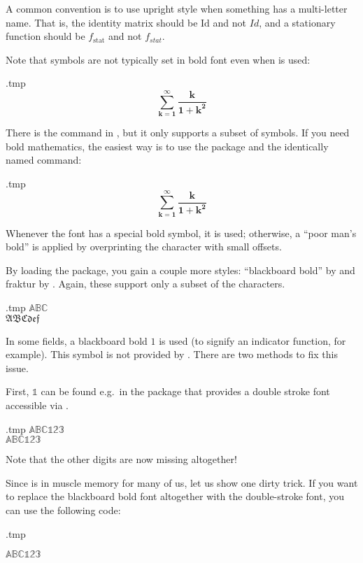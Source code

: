 \begin{practices}
A common convention is to use upright style when something has a multi-letter name.
That is, the identity matrix should be $\mathrm{Id}$ and not $Id$,
and a stationary function should be $f_{\mathrm{stat}}$ and not $f_{stat}$.
\end{practices}

Note that symbols are not typically set in bold font even when  is used:
%
\begin{VerbatimOut}{\jobname.tmp}
\[
\mathbf{\sum_{k=1}^\infty \frac{k}{1+k^2}}
\]
\end{VerbatimOut}
\ShowExample
%
There is the  command in ,
but it only supports a subset of symbols.
If you need bold mathematics, the easiest way is to use the  package
and the identically named command:
%
\begin{VerbatimOut}{\jobname.tmp}
\[
\bm{\sum_{k=1}^\infty \frac{k}{1+k^2}}
\]
\end{VerbatimOut}
\ShowExample
%
Whenever the font has a special bold symbol, it is used;
otherwise, a ``poor man's bold'' is applied by overprinting the character with small offsets.


By loading the  package, you gain a couple more styles:
``blackboard bold'' by  and fraktur by .
Again, these support only a subset of the characters.
%
\begin{VerbatimOut}{\jobname.tmp}
$\mathbb{ABC}$\\
$\mathfrak{ABCdef}$
\end{VerbatimOut}
\ShowExample

In some fields, a blackboard bold $1$ is used (to signify an indicator function, for example).
This symbol is not provided by .
There are two methods to fix this issue.

First, $\mathds 1$ can be found e.g.\ in the  package
that provides a double stroke font accessible via .
%
\begin{VerbatimOut}{\jobname.tmp}
$\mathbb{ABC123}$\\
$\mathds{ABC123}$
\end{VerbatimOut}
\ShowExample
%
Note that the other digits are now missing altogether!

Since  is in muscle memory for many of us, let us show one dirty trick.
If you want to replace the blackboard bold font altogether with the double-stroke font,
you can use the following code:
%
\begin{VerbatimOut}{\jobname.tmp}
\DeclareCommandCopy{\mathbb}{\mathds}

$\mathbb{ABC123}$
\end{VerbatimOut}
\ShowExample


